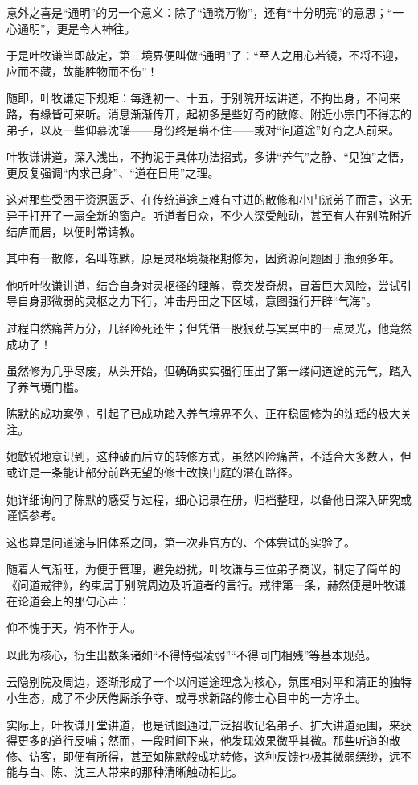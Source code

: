 意外之喜是“通明”的另一个意义：除了“通晓万物”，还有“十分明亮”的意思；“一心通明”，更是令人神往。

于是叶牧谦当即敲定，第三境界便叫做“通明”了：“至人之用心若镜，不将不迎，应而不藏，故能胜物而不伤”！

随即，叶牧谦定下规矩：每逢初一、十五，于别院开坛讲道，不拘出身，不问来路，有缘皆可来听。消息渐渐传开，起初多是些好奇的散修、附近小宗门不得志的弟子，以及一些仰慕沈瑶——身份终是瞒不住——或对“问道途”好奇之人前来。

叶牧谦讲道，深入浅出，不拘泥于具体功法招式，多讲“养气”之静、“见独”之悟，更反复强调“内求己身”、“道在日用”之理。

这对那些受困于资源匮乏、在传统道途上难有寸进的散修和小门派弟子而言，这无异于打开了一扇全新的窗户。听道者日众，不少人深受触动，甚至有人在别院附近结庐而居，以便时常请教。

其中有一散修，名叫陈默，原是灵枢境凝枢期修为，因资源问题困于瓶颈多年。

他听叶牧谦讲道，结合自身对灵枢径的理解，竟突发奇想，冒着巨大风险，尝试引导自身那微弱的灵枢之力下行，冲击丹田之下区域，意图强行开辟“气海”。

过程自然痛苦万分，几经险死还生；但凭借一股狠劲与冥冥中的一点灵光，他竟然成功了！

虽然修为几乎尽废，从头开始，但确确实实强行压出了第一缕问道途的元气，踏入了养气境门槛。

陈默的成功案例，引起了已成功踏入养气境界不久、正在稳固修为的沈瑶的极大关注。

她敏锐地意识到，这种破而后立的转修方式，虽然凶险痛苦，不适合大多数人，但或许是一条能让部分前路无望的修士改换门庭的潜在路径。

她详细询问了陈默的感受与过程，细心记录在册，归档整理，以备他日深入研究或谨慎参考。

这也算是问道途与旧体系之间，第一次非官方的、个体尝试的实验了。

\vspace{2em}

随着人气渐旺，为便于管理，避免纷扰，叶牧谦与三位弟子商议，制定了简单的《问道戒律》，约束居于别院周边及听道者的言行。戒律第一条，赫然便是叶牧谦在论道会上的那句心声：

仰不愧于天，俯不怍于人。

以此为核心，衍生出数条诸如“不得恃强凌弱”“不得同门相残”等基本规范。

云隐别院及周边，逐渐形成了一个以问道途理念为核心，氛围相对平和清正的独特小生态，成了不少厌倦厮杀争夺、或寻求新路的修士心目中的一方净土。

实际上，叶牧谦开堂讲道，也是试图通过广泛招收记名弟子、扩大讲道范围，来获得更多的道行反哺；然而，一段时间下来，他发现效果微乎其微。那些听道的散修、访客，即便有所得，甚至如陈默般成功转修，这种反馈也极其微弱缥缈，远不能与白、陈、沈三人带来的那种清晰触动相比。

